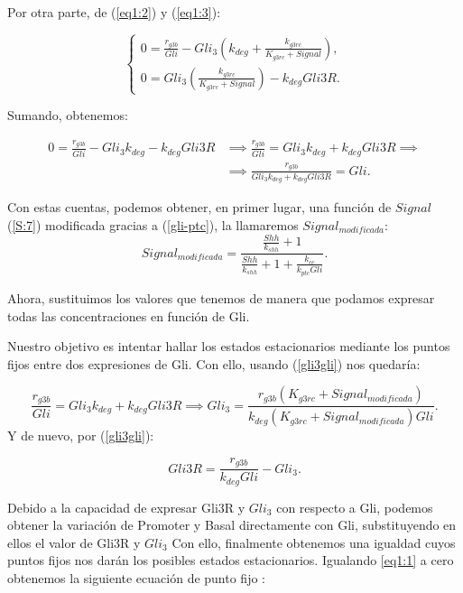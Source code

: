 Por otra parte, de (\ref{eq1:2}) y (\ref{eq1:3}):



$$\begin{cases} 0 = \frac{r_{g3b}}{Gli}-Gli_3\left(k_{deg}+\frac{k_{g3rc}}{K_{g3rc}+Signal}\right), \\0=Gli_3\left(\frac{k_{g3rc}}{K_{g3rc}+Signal}\right)-k_{deg}Gli3R. \end{cases}$$

Sumando, obtenemos:

\begin{equation}
\begin{split}
0=\frac{r_{g3b}}{Gli}-Gli_3k_{deg}-k_{deg}Gli3R & \implies \frac{r_{g3b}}{Gli}=Gli_3k_{deg}+k_{deg}Gli3R\implies
\\
& \implies \frac{r_{g3b}}{Gli_3k_{deg}+k_{deg}Gli3R}=Gli.
\end{split}
\label{gli3gli}
\end{equation}

Con estas cuentas, podemos obtener, en primer lugar, una función de $Signal$ (\ref{S:7}) modificada gracias a (\ref{gli-ptc}), la llamaremos $Signal_{modificada}$:
\begin{equation}
Signal_{modificada}=\frac{\frac{Shh}{k_{shh}} + 1}{\frac{Shh}{k_{shh}} + 1 + \frac{k_{cc}}{k_{ptc}Gli}}.
\end{equation}

Ahora, sustituimos los valores que tenemos de manera que podamos expresar todas las concentraciones en función de Gli. 

Nuestro objetivo es intentar hallar los estados estacionarios mediante los puntos fijos entre dos expresiones de Gli. Con ello, usando (\ref{gli3gli}) nos quedaría:

\begin{equation}
 \frac{r_{g3b}}{Gli}=Gli_3k_{deg}+k_{deg}Gli3R
 \implies Gli_3=\frac{r_{g3b}(K_{g3rc}+Signal_{modificada})}{k_{deg}(K_{g3rc}+Signal_{modificada})Gli}.
\label{equgli3}
\end{equation}
 Y de nuevo, por  (\ref{gli3gli}):
 
 \begin{equation}
 Gli3R=\frac{r_{g3b}}{k_{deg}Gli}-Gli_3.
 \label{equgli3r}
 \end{equation}

Debido a la capacidad de expresar Gli3R y $Gli_3$ con respecto a Gli, podemos obtener la variación de Promoter y Basal directamente con Gli, substituyendo en ellos el valor de Gli3R y $Gli_3$
Con ello, finalmente obtenemos una igualdad cuyos puntos fijos nos darán los posibles estados estacionarios. Igualando \ref{eq1:1} a cero obtenemos la siguiente ecuación de punto fijo :

